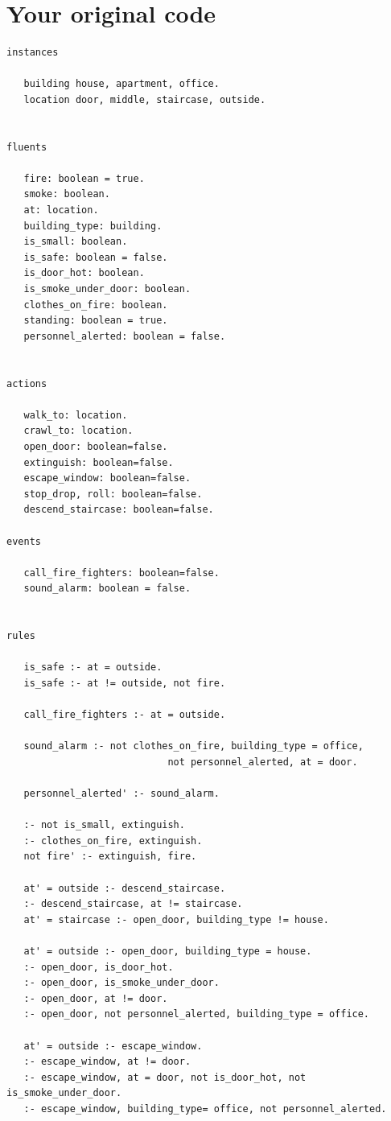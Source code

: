 \documentclass[a4paper,12pt]{report}
\begin{document}
\appendix

\chapter{Your original code}
\label{app:original_code}

\begin{verbatim}
instances

   building house, apartment, office.
   location door, middle, staircase, outside.


fluents

   fire: boolean = true.
   smoke: boolean.
   at: location.
   building_type: building.
   is_small: boolean.
   is_safe: boolean = false.
   is_door_hot: boolean.
   is_smoke_under_door: boolean.
   clothes_on_fire: boolean.
   standing: boolean = true.
   personnel_alerted: boolean = false.

	
actions

   walk_to: location.
   crawl_to: location.
   open_door: boolean=false.
   extinguish: boolean=false.
   escape_window: boolean=false.
   stop_drop, roll: boolean=false.
   descend_staircase: boolean=false.	
 
events 

   call_fire_fighters: boolean=false.
   sound_alarm: boolean = false.


rules	

   is_safe :- at = outside.
   is_safe :- at != outside, not fire.

   call_fire_fighters :- at = outside.

   sound_alarm :- not clothes_on_fire, building_type = office,
			                not personnel_alerted, at = door.
	
   personnel_alerted' :- sound_alarm.	
	
   :- not is_small, extinguish.
   :- clothes_on_fire, extinguish.
   not fire' :- extinguish, fire.
	
   at' = outside :- descend_staircase.
   :- descend_staircase, at != staircase.
   at' = staircase :- open_door, building_type != house.
	
   at' = outside :- open_door, building_type = house.
   :- open_door, is_door_hot.
   :- open_door, is_smoke_under_door.
   :- open_door, at != door.
   :- open_door, not personnel_alerted, building_type = office.
   
   at' = outside :- escape_window.
   :- escape_window, at != door.
   :- escape_window, at = door, not is_door_hot, not is_smoke_under_door.
   :- escape_window, building_type= office, not personnel_alerted.


\end{verbatim}
\end{document}
